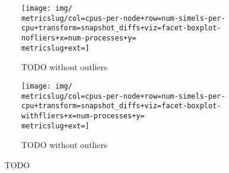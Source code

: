 \begin{figure*}
  \centering
  \begin{subfigure}[b]{0.5\textwidth}
    \centering
    \texttt{[image: img/\\metricslug/col=cpus-per-node+row=num-simels-per-cpu+transform=snapshot\_diffs+viz=facet-boxplot-nofliers+x=num-processes+y=\\metricslug+ext=]}
    \caption{TODO without outliers}
    \label{fig:distribution-\metricslug-nofliers}
  \end{subfigure}%
  \begin{subfigure}[b]{0.5\textwidth}
    \centering
    \texttt{[image: img/\\metricslug/col=cpus-per-node+row=num-simels-per-cpu+transform=snapshot\_diffs+viz=facet-boxplot-withfliers+x=num-processes+y=\\metricslug+ext=]}
    \caption{TODO without outliers}
    \label{fig:distribution-\metricslug-withfliers}
  \end{subfigure}
  \caption{\metricslug ~ TODO}
  \label{fig:distribution-\metricslug}
\end{figure*}
